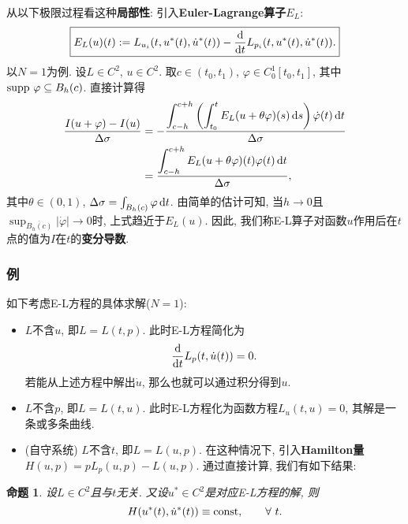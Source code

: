 \documentclass[12pt,a4paper]{article}
\newtheorem{proposition}[theorem]{命题}
\begin{document}
从以下极限过程看这种\textbf{局部性}: 引入\textbf{Euler-Lagrange算子}$E_L$:
\begin{equation*}
    \boxed{E_L(u)(t) := L_{u_i}(t, u^*(t), \dot{u}^*(t)) - \frac{{\rm d}}{{\rm d}t}L_{p_i}(t, u^*(t), \dot{u}^*(t)).}
\end{equation*}
以$N = 1$为例. 设$L \in C^2$, $u \in C^2$. 取$c \in (t_0, t_1)$, $\varphi \in C_0^1[t_0, t_1]$, 其中${\rm supp}\ \varphi \subseteq B_h(c)$.
直接计算得 
\begin{align*}
    \frac{I(u + \varphi) - I(u)}{\Delta\sigma} &=- \frac{\displaystyle\int_{c - h}^{c + h}\left(\int_{t_0}^tE_L(u + \theta\varphi)(s) \,{\rm d}s\right)\dot{\varphi}(t) \,{\rm d}t}{\Delta\sigma} \\ 
    &= \frac{\displaystyle\int_{c - h}^{c + h}E_L(u + \theta\varphi)(t)\varphi(t) \,{\rm d}t}{\Delta\sigma},
\end{align*}
其中$\theta \in (0, 1)$, $\Delta\sigma = \int_{B_h(c)}\varphi \,{\rm d}t$.
由简单的估计可知, 当$h \rightarrow 0$且$\sup_{\overline{B_h(c)}}|\dot\varphi| \rightarrow 0$时, 上式趋近于$E_L(u)$.
因此, 我们称E-L算子对函数$u$作用后在$t$点的值为$I$在$t$的\textbf{变分导数}.

\subsubsection{例}

如下考虑E-L方程的具体求解($N = 1$):

\begin{itemize}
    \item $L$不含$u$, 即$L = L(t, p)$. 此时E-L方程简化为 
    \begin{equation*}
        \frac{{\rm d}}{{\rm d}t}L_p(t, \dot{u}(t)) = 0.
    \end{equation*}
    若能从上述方程中解出$\dot u$, 那么也就可以通过积分得到$u$.
    \item $L$不含$p$, 即$L = L(t, u)$. 此时E-L方程化为函数方程$L_u(t, u) = 0$, 其解是一条或多条曲线.
    \item (自守系统) $L$不含$t$, 即$L = L(u, p)$. 在这种情况下, 引入\textbf{Hamilton量}$H(u, p) = pL_p(u, p) - L(u, p)$.
    通过直接计算, 我们有如下结果:
\end{itemize}

\begin{proposition}
    设$L \in C^2$且与$t$无关. 又设$u^* \in C^2$是对应E-L方程的解, 则
    \begin{equation*}
        H(u^*(t), \dot u^*(t)) \equiv {\rm const}, \qquad \forall\ t.
    \end{equation*}
\end{proposition}
\end{document}
